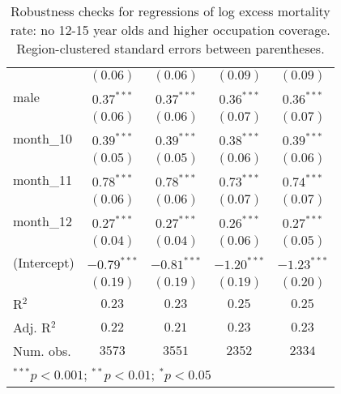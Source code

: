 \begin{table}[h!]
\begin{center}
\begin{small}
\begin{tabular}{l c c c c}
               & $(0.06)$      & $(0.06)$      & $(0.09)$      & $(0.09)$      \\
male           & $0.37^{***}$  & $0.37^{***}$  & $0.36^{***}$  & $0.36^{***}$  \\
               & $(0.06)$      & $(0.06)$      & $(0.07)$      & $(0.07)$      \\
month\_10      & $0.39^{***}$  & $0.39^{***}$  & $0.38^{***}$  & $0.39^{***}$  \\
               & $(0.05)$      & $(0.05)$      & $(0.06)$      & $(0.06)$      \\
month\_11      & $0.78^{***}$  & $0.78^{***}$  & $0.73^{***}$  & $0.74^{***}$  \\
               & $(0.06)$      & $(0.06)$      & $(0.07)$      & $(0.07)$      \\
month\_12      & $0.27^{***}$  & $0.27^{***}$  & $0.26^{***}$  & $0.27^{***}$  \\
               & $(0.04)$      & $(0.04)$      & $(0.06)$      & $(0.05)$      \\
(Intercept)    & $-0.79^{***}$ & $-0.81^{***}$ & $-1.20^{***}$ & $-1.23^{***}$ \\
               & $(0.19)$      & $(0.19)$      & $(0.19)$      & $(0.20)$      \\
\hline
R$^2$          & $0.23$        & $0.23$        & $0.25$        & $0.25$        \\
Adj. R$^2$     & $0.22$        & $0.21$        & $0.23$        & $0.23$        \\
Num. obs.      & $3573$        & $3551$        & $2352$        & $2334$        \\
\hline
\multicolumn{5}{l}{\tiny{$^{***}p<0.001$; $^{**}p<0.01$; $^{*}p<0.05$}}
\end{tabular}
\end{small}
\caption{Robustness checks for regressions of log excess mortality rate: no 12-15 year olds and higher occupation coverage. Region-clustered standard errors between parentheses.}
\label{tab:altmodels}
\end{center}
\end{table}
